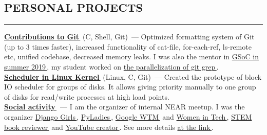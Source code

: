 \documentclass[11pt]{res} %
\let\orighref\href
\renewcommand{\href}[2]{\orighref{#1}{#2\,\faExternalLink}}
\begin{document}
\begin{resume}
        \section{\uppercase{Personal Projects}}
        \begin{spacing}{0.3}
            \textcolor[RGB]{220,220,220}{\rule{\linewidth}{0.4pt}}
        \end{spacing}
        \textbf{\href{https://github.com/git/git/commits?author=telezhnaya}{Contributions to Git}} (C, Shell, Git)~--- Optimized formatting system of Git (up to 3 times faster), increased functionality of cat-file, for-each-ref, ls-remote etc, unified codebase, decreased memory leaks. I was also the mentor in \href{https://summerofcode.withgoogle.com/}{GSoC in summer 2019}, my student worked on \href{https://summerofcode.withgoogle.com/projects/\#6477677521797120}{the parallelization of git grep}.\\
        \textbf{\href{https://github.com/telezhnaya/linux}{Scheduler in Linux Kernel}} (Linux, C, Git)~--- Created the prototype of block IO scheduler for groups of disks. It allows giving priority manually to one group of disks for read/write processes at high load points.\\
        \textbf{\href{https://github.com/telezhnaya/about/blob/master/My_social_impact.md}{Social activity}}~--- I am the organizer of internal NEAR meetup. I was the organizer \href{https://djangogirls.org/stpetersburg/}{Django Girls}, \href{https://spb.pyladies.com/}{PyLadies}, \href{https://www.womentechmakers.com}{Google WTM} and \href{https://women-in-tech.org}{Women in Tech}, \href{https://dmkpress.com/catalog/computer/}{STEM book reviewer} and \href{https://www.youtube.com/programming_together/}{YouTube creator}. See more details \href{https://github.com/telezhnaya/about/blob/master/My_social_impact.md}{at the link}.




\end{resume}
\end{document}
